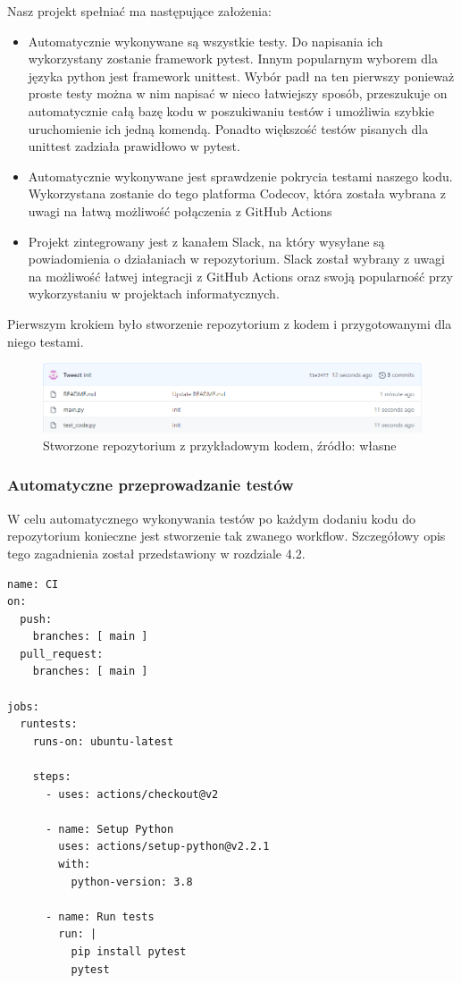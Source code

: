 Nasz projekt spełniać ma następujące założenia: 
\begin{itemize}
    \item Automatycznie wykonywane są wszystkie testy. Do napisania ich wykorzystany zostanie framework pytest. Innym popularnym wyborem dla języka python jest framework unittest. Wybór padł na ten pierwszy ponieważ proste testy można w nim napisać w nieco łatwiejszy sposób, przeszukuje on automatycznie całą bazę kodu w poszukiwaniu testów i umożliwia szybkie uruchomienie ich jedną komendą. Ponadto większość testów pisanych dla unittest zadziała prawidłowo w pytest.
    \item Automatycznie wykonywane jest sprawdzenie pokrycia testami naszego kodu. Wykorzystana zostanie do tego platforma Codecov, która została wybrana z uwagi na łatwą możliwość połączenia z GitHub Actions
    \item Projekt zintegrowany jest z kanałem Slack, na który wysyłane są powiadomienia o działaniach w repozytorium. Slack został wybrany z uwagi na możliwość łatwej integracji z GitHub Actions oraz swoją popularność przy wykorzystaniu w projektach informatycznych. 
\end{itemize}

Pierwszym krokiem było stworzenie repozytorium z kodem i przygotowanymi dla niego testami. 

\begin{figure}[htbp]
    \centering
    \includegraphics[width=13cm]{images/testingCI1.png}
    \caption{Stworzone repozytorium z przykładowym kodem, źródło: własne}
    \label{fig:ci1}
\end{figure}

\subsubsection{Automatyczne przeprowadzanie testów}
W celu automatycznego wykonywania testów po każdym dodaniu kodu do repozytorium konieczne jest stworzenie tak zwanego workflow. Szczegółowy opis tego zagadnienia został przedstawiony w rozdziale 4.2. 

\begin{lstlisting}[caption={plik main.yaml zawierający workflow automatycznie przeprowadzający testy}]
name: CI
on:
  push:
    branches: [ main ]
  pull_request:
    branches: [ main ]

jobs:
  runtests:
    runs-on: ubuntu-latest

    steps:
      - uses: actions/checkout@v2

      - name: Setup Python
        uses: actions/setup-python@v2.2.1
        with: 
          python-version: 3.8 

      - name: Run tests
        run: |
          pip install pytest
          pytest
\end{lstlisting}

